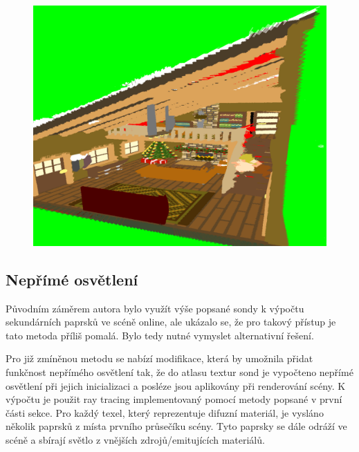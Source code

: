 \begin{figure}[H]
	\centering
	\includegraphics[scale=1]{images/probe_scene_render.png}
	\captionsetup{justification=centering}
	\label{fig:lfp_scene_render}
\end{figure}

\subsection{Nepřímé osvětlení}\label{sec:indirect}
Původním záměrem autora bylo využít výše popsané sondy k výpočtu sekundárních paprsků ve scéně online, ale ukázalo se, že pro takový přístup je tato metoda příliš pomalá. Bylo tedy nutné vymyslet alternativní řešení. 

Pro již zmíněnou metodu se nabízí modifikace, která by umožnila přidat funkčnost nepřímého osvětlení tak, že do atlasu textur sond je vypočteno nepřímé osvětlení při jejich inicializaci a posléze jsou aplikovány při renderování scény.  K výpočtu je použit ray tracing implementovaný pomocí metody popsané v první části sekce. Pro každý texel, který reprezentuje difuzní materiál, je vysláno několik paprsků z místa prvního průsečíku scény. Tyto paprsky se dále odráží ve scéně a sbírají světlo z vnějších zdrojů/emitujících materiálů.


